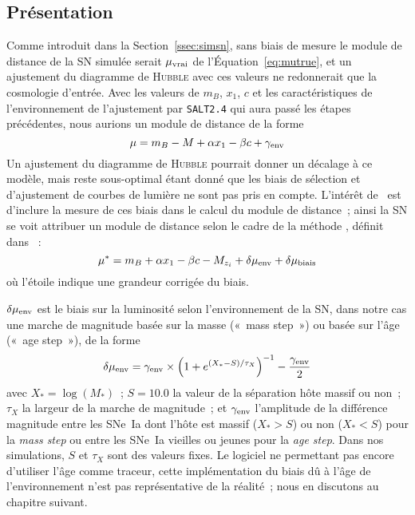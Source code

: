 \documentclass[../main/main.tex]{subfiles}
\begin{document}
\subsection{Présentation}\label{ssec:bbcintro}

Comme introduit dans la Section~\ref{ssec:simsn}, sans biais de mesure le module
de distance de la SN simulée serait $\mu_{\rm vrai}$ de
l'Équation~\ref{eq:mutrue}, et un ajustement du diagramme de \textsc{Hubble}
avec ces valeurs ne redonnerait que la cosmologie d'entrée. Avec les valeurs de
$m_B$, $x_1$, $c$ et les caractéristiques de l'environnement de l'ajustement par
\texttt{SALT2.4} qui aura passé les étapes précédentes, nous aurions un module
de distance de la forme
\begin{equation}\label{eq:mu}
    \mu = m_B - M + \alpha x_1 - \beta c + \gamma_{\rm env}
\end{equation}
Un ajustement du diagramme de \textsc{Hubble} pourrait donner un décalage à ce
modèle, mais reste sous-optimal étant donné que les biais de sélection et
d'ajustement de courbes de lumière ne sont pas pris en compte. L'intérêt de
\bbc\ est d'inclure la mesure de ces biais dans le calcul du module de
distance~; ainsi la SN se voit attribuer un module de distance selon le cadre de
la méthode \bbc, définit dans \citep{popovic2021a}~:
\begin{equation}\label{eq:mucorr}
    \mu^* = m_B + \alpha x_1 - \beta c - M_{z_i} + \delta\mu_{\rm env} +
    \delta\mu_{\rm biais}
\end{equation}
où l'étoile indique une grandeur corrigée du biais.

$\delta\mu_{\rm env}$ est le biais sur la luminosité selon l'environnement de la
SN, dans notre cas une marche de magnitude basée sur la masse («~mass step~») ou
basée sur l'âge («~age step~»), de la forme
\begin{equation}
    \delta\mu_{\rm env} = \gamma_{\rm env}\times \left(1 + e^{(X_*-S)/\tau_X}
    \right)^{-1} - \frac{\gamma_{\rm env}}{2}
\end{equation}
avec $X_* = \log(M_*)$~; $S = \num{10.0}$ la valeur de la séparation hôte massif
ou non~; $\tau_X$ la largeur de la marche de magnitude~; et $\gamma_{\rm env}$
l'amplitude de la différence magnitude entre les SNe~Ia dont l'hôte est massif
($X_* > S$) ou non ($X_* < S$) pour la \textit{mass step} ou entre les SNe~Ia
vieilles ou jeunes pour la \textit{age step}. Dans nos simulations, $S$ et
$\tau_X$ sont des valeurs fixes. Le logiciel ne permettant pas encore d'utiliser
l'âge comme traceur, cette implémentation du biais dû à l'âge de l'environnement
n'est pas représentative de la réalité~; nous en discutons au chapitre suivant. 
\end{document}

